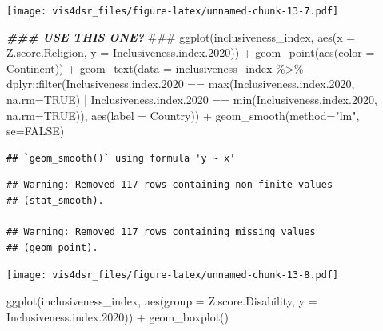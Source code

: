 \documentclass[
]{krantz}
\makeatletter
\newenvironment{Shaded}{\begin{snugshade}}{\end{snugshade}}
\newcommand{\AlertTok}[1]{\textcolor[rgb]{0.33,0.33,0.33}{#1}}
\newcommand{\AttributeTok}[1]{\textcolor[rgb]{0.61,0.61,0.61}{#1}}
\newcommand{\ConstantTok}[1]{\textcolor[rgb]{0,0,0}{#1}}
\newcommand{\DocumentationTok}[1]{\textcolor[rgb]{0.37,0.37,0.37}{\textbf{\textit{#1}}}}
\newcommand{\FloatTok}[1]{\textcolor[rgb]{0.06,0.06,0.06}{#1}}
\newcommand{\FunctionTok}[1]{\textcolor[rgb]{0,0,0}{#1}}
\newcommand{\NormalTok}[1]{#1}
\newcommand{\SpecialCharTok}[1]{\textcolor[rgb]{0,0,0}{#1}}
\newcommand{\StringTok}[1]{\textcolor[rgb]{0.5,0.5,0.5}{#1}}
\newenvironment{kframe}{%
\medskip{}
\setlength{\fboxsep}{.8em}
 \def\at@end@of@kframe{}%
 \ifinner\ifhmode%
  \def\at@end@of@kframe{\end{minipage}}%
  \begin{minipage}{\columnwidth}%
 \fi\fi%
 \def\FrameCommand##1{\hskip\@totalleftmargin \hskip-\fboxsep
 \colorbox{shadecolor}{##1}\hskip-\fboxsep
     \hskip-\linewidth \hskip-\@totalleftmargin \hskip\columnwidth}%
 \MakeFramed {\advance\hsize-\width
   \@totalleftmargin\z@ \linewidth\hsize
   \@setminipage}}%
 {\par\unskip\endMakeFramed%
 \at@end@of@kframe}
\renewenvironment{Shaded}{\begin{kframe}}{\end{kframe}}
\makeatother
\begin{document}
\texttt{[image: vis4dsr\_files/figure-latex/unnamed-chunk-13-7.pdf]}

\begin{Shaded}
\begin{Highlighting}[]
\DocumentationTok{\#\#\# USE THIS ONE? }\AlertTok{\#\#\#}
\FunctionTok{ggplot}\NormalTok{(inclusiveness\_index, }
       \FunctionTok{aes}\NormalTok{(}\AttributeTok{x =}\NormalTok{ Z.score.Religion, }
           \AttributeTok{y =}\NormalTok{ Inclusiveness.index}\FloatTok{.2020}\NormalTok{)) }\SpecialCharTok{+}
  \FunctionTok{geom\_point}\NormalTok{(}\FunctionTok{aes}\NormalTok{(}\AttributeTok{color =}\NormalTok{ Continent)) }\SpecialCharTok{+}
  \FunctionTok{geom\_text}\NormalTok{(}\AttributeTok{data =}\NormalTok{ inclusiveness\_index }\SpecialCharTok{\%\textgreater{}\%} 
\NormalTok{              dplyr}\SpecialCharTok{::}\FunctionTok{filter}\NormalTok{(Inclusiveness.index}\FloatTok{.2020} \SpecialCharTok{==} \FunctionTok{max}\NormalTok{(Inclusiveness.index}\FloatTok{.2020}\NormalTok{, }\AttributeTok{na.rm=}\ConstantTok{TRUE}\NormalTok{) }\SpecialCharTok{|}\NormalTok{ Inclusiveness.index}\FloatTok{.2020} \SpecialCharTok{==} \FunctionTok{min}\NormalTok{(Inclusiveness.index}\FloatTok{.2020}\NormalTok{, }\AttributeTok{na.rm=}\ConstantTok{TRUE}\NormalTok{)), }\FunctionTok{aes}\NormalTok{(}\AttributeTok{label =}\NormalTok{ Country)) }\SpecialCharTok{+} 
  \FunctionTok{geom\_smooth}\NormalTok{(}\AttributeTok{method=}\StringTok{"lm"}\NormalTok{, }\AttributeTok{se=}\ConstantTok{FALSE}\NormalTok{)}
\end{Highlighting}
\end{Shaded}

\begin{verbatim}
## `geom_smooth()` using formula 'y ~ x'
\end{verbatim}

\begin{verbatim}
## Warning: Removed 117 rows containing non-finite values
## (stat_smooth).

## Warning: Removed 117 rows containing missing values
## (geom_point).
\end{verbatim}

\texttt{[image: vis4dsr\_files/figure-latex/unnamed-chunk-13-8.pdf]}

\begin{Shaded}
\begin{Highlighting}[]
\FunctionTok{ggplot}\NormalTok{(inclusiveness\_index, }
       \FunctionTok{aes}\NormalTok{(}\AttributeTok{group =}\NormalTok{ Z.score.Disability, }
           \AttributeTok{y =}\NormalTok{ Inclusiveness.index}\FloatTok{.2020}\NormalTok{)) }\SpecialCharTok{+}
  \FunctionTok{geom\_boxplot}\NormalTok{()}
\end{Highlighting}
\end{Shaded}
\end{document}

